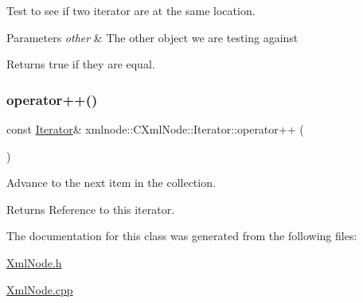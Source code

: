 Test to see if two iterator are at the same location. 


\begin{DoxyParams}{Parameters}
{\em other} & The other object we are testing against \\
\hline
\end{DoxyParams}
\begin{DoxyReturn}{Returns}
true if they are equal. 
\end{DoxyReturn}
\mbox{\label{classxmlnode_1_1_c_xml_node_1_1_iterator_aefa7392f7c198dcf907d8458fbf0db1a}} 
\subsubsection{\texorpdfstring{operator++()}{operator++()}}
{\footnotesize\ttfamily const \mbox{\hyperlink{classxmlnode_1_1_c_xml_node_1_1_iterator}{Iterator}}\& xmlnode\+::\+C\+Xml\+Node\+::\+Iterator\+::operator++ (\begin{DoxyParamCaption}{ }\end{DoxyParamCaption})\hspace{0.3cm}{\ttfamily [inline]}}



Advance to the next item in the collection. 

\begin{DoxyReturn}{Returns}
Reference to this iterator. 
\end{DoxyReturn}


The documentation for this class was generated from the following files\+:\begin{DoxyCompactItemize}
\item 
\mbox{\hyperlink{_xml_node_8h}{Xml\+Node.\+h}}\item 
\mbox{\hyperlink{_xml_node_8cpp}{Xml\+Node.\+cpp}}\end{DoxyCompactItemize}
